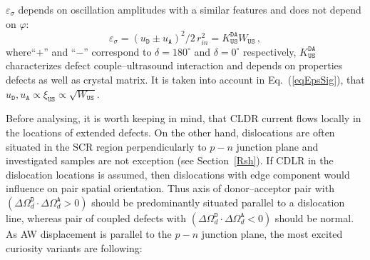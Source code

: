 \documentclass[aip,jap, amsmath,amssymb,reprint]{revtex4-1}
\begin{document}
$\varepsilon_{\sigma}$ depends on oscillation amplitudes with a similar features and
does not depend on $\varphi$:
\begin{equation}
\label{eqEpsSig}
\varepsilon_{\sigma}=(u_\mathtt{D}\pm u_\mathtt{A})^2/2\,r_{in}^2=K_\mathtt{US}^\mathtt{DA}W_{\mathtt{US}}\,,
\end{equation}
where``$+$'' and ``$-$'' correspond to $\delta=180^\circ$ and $\delta=0^\circ$ respectively,
$K_\mathtt{US}^\mathtt{DA}$ characterizes defect couple--ultrasound interaction and depends on properties defects as well as crystal matrix.
It is taken into account in Eq.~(\ref{eqEpsSig}), that $u_\mathtt{D},u_\mathtt{A}\propto \xi_\mathtt{US}\propto\sqrt{W_\mathtt{US}}$.

Before analysing, it is worth keeping in mind, that
CLDR current flows locally in the locations of extended defects.\cite{CDLR:JAP,CDLR:SSP}
On the other hand, dislocations are often situated in the SCR region perpendicularly to $p-n$ junction plane
and investigated samples are not exception (see Section~\ref{Rsh}).
If CDLR in the dislocation locations is assumed, then dislocations with edge component would influence on pair spatial orientation.
Thus axis of donor--acceptor pair with $(\Delta\Omega_d^\mathtt{D}\cdot\Delta\Omega_d^\mathtt{A}>0)$  should be predominantly situated parallel to a dislocation line,
whereas pair of coupled defects with $(\Delta\Omega_d^\mathtt{D}\cdot\Delta\Omega_d^\mathtt{A}<0)$ should be normal.
As AW displacement is parallel to the $p-n$ junction plane,
the most excited curiosity variants are following:


\end{document}
